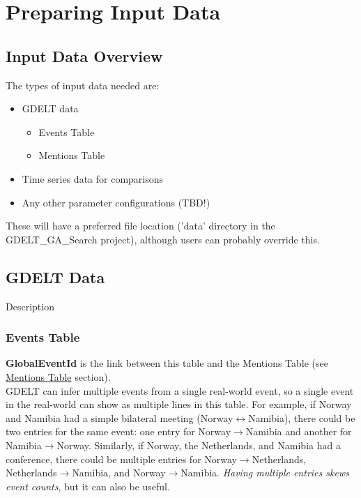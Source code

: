 
\chapter{Preparing Input Data} \label{chap:PreparingInputData}
\section{Input Data Overview}

The types of input data needed are:
\begin{itemize}
\item GDELT data 
\begin{itemize}\item Events Table \item Mentions Table\end{itemize}
\item Time series data for comparisons
\item Any other parameter configurations (TBD!)
\end{itemize}

\par These will have a preferred file location ('data' directory in the GDELT\_GA\_Search project), although users can probably override this.

\section{GDELT Data}
Description
\subsection{Events Table}
\par \textbf{GlobalEventId} is the link between this table and the Mentions Table (see \hyperlink{section.4.2}{Mentions Table} section). \\GDELT can infer multiple events from a single real-world event, so a single event in the real-world can show as multiple lines in this table. For example, if Norway and Namibia had a simple bilateral meeting (Norway$\leftrightarrow$Namibia), there could be two entries for the same event: one entry for Norway$\rightarrow$Namibia and another for Namibia$\rightarrow$Norway. Similarly, if Norway, the Netherlands, and Namibia had a conference, there could be multiple entries for Norway$\rightarrow$Netherlands, Netherlands$\rightarrow$Namibia, and Norway$\rightarrow$Namibia. \emph{Having multiple entries skews event counts}, but it can also be useful.


